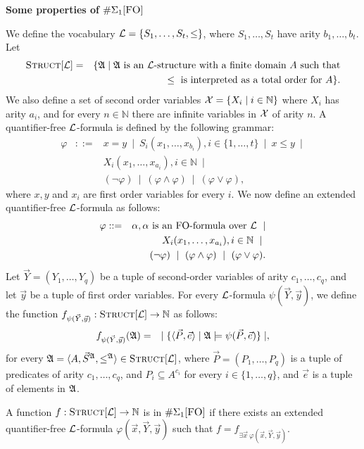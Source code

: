 \documentclass[12pt]{article}
\def\E1{\#\Sigma_1[\mbox{{\sc FO}}]}
\def\Truc{\textsc{Struct}[\L]}
\def\A{{\frak A}}
\def\L{{\cal L}}
\def\N{\mathbb{N}}
\def\P{\vec{P}}
\def\S{\vec{S}}
\def\Y{\vec{Y}}
\def\e{\vec{e}} %
\def\x{\vec{x}} %
\def\y{\vec{y}} %
\begin{document}
\begin{center}
{ \LARGE \bf
  Some properties of $\E1$
}
\end{center}

We define the vocabulary $\L = \{ S_1,\dots,S_t, \leq \}$, where $S_1,\dots,S_t$ have arity $b_1,\dots,b_t$. Let
\begin{eqnarray*}
\Truc &=& \{\A \mid \A \text{ is an } \L \text{-structure with a finite domain } A \text{ such that} \\
&& \leq \text{ is interpreted as a total order for } A \}.
\end{eqnarray*}
We also define a set of second order variables ${\cal X} = \{ X_i \mid i\in\N \}$ where $X_i$ has arity $a_i$, and for every $n \in \N$ there are infinite variables in ${\cal X}$ of arity $n$. A quantifier-free $\L$-formula is defined by the following grammar:
\begin{eqnarray*}
\varphi &::=& x = y \ \mid \ S_i(x_1,\dots,x_{b_i}), i \in \{1,\dots,t\} \ \mid \ x \leq y \ \mid \\
&& X_i(x_1,\dots,x_{a_i}), i\in\N \ \mid \\ 
&& (\neg \varphi) \ \mid \ (\varphi \wedge \varphi) \ \mid \ (\varphi \vee \varphi),
\end{eqnarray*}
where $x,y$ and $x_i$ are first order variables for every $i$. We now define an extended quantifier-free $\L$-formula as follows:
\begin{eqnarray*}
\varphi &::=& \alpha, \alpha \text{ is an FO-formula over } \L  \ \mid \\
&& X_i(x_1,\dots,x_{a_i}), i\in\N \ \mid \ \\
&& (\neg \varphi) \ \mid \ (\varphi \wedge \varphi) \ \mid \ (\varphi \vee \varphi).
\end{eqnarray*}
Let $\Y = (Y_1,\dots,Y_q)$ be a tuple of second-order variables of arity $c_1,\ldots,c_q$, and let $\y$ be a tuple of first order variables. For every $\L$-formula $\psi(\Y,\y)$, we define the function $f_{\psi(\Y,\y)}:\Truc \to \N$ as follows:
\begin{eqnarray*}
f_{\psi(\Y,\y)}(\A) &=& \mid \{ \langle \P, \e \rangle \mid \A \models \psi(\P,\e) \} \mid,
\end{eqnarray*}
for every $\A = \langle A, \S^{\A}, \leq^{\A} \rangle \in \Truc$, where $\P = (P_1,\ldots,P_q)$ is a tuple of predicates of arity $c_1,\ldots,c_q$, and $P_i \subseteq A^{c_i}$ for every $i \in \{1,\ldots,q\}$, and $\e$ is a tuple of elements in $\A$.

A function $f:\Truc \to \N$ is in $\E1$ if there exists an extended quantifier-free $\L$-formula $\varphi(\x,\Y,\y)$ such that $f = f_{\exists \x \: \varphi(\x,\Y,\y)}.$\\
\end{document}
